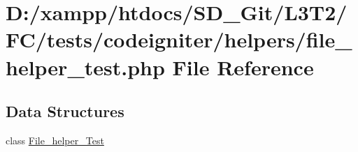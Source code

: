 \hypertarget{file__helper__test_8php}{}\section{D\+:/xampp/htdocs/\+S\+D\+\_\+\+Git/\+L3\+T2/\+F\+C/tests/codeigniter/helpers/file\+\_\+helper\+\_\+test.php File Reference}
\label{file__helper__test_8php}
\subsection*{Data Structures}
\begin{DoxyCompactItemize}
\item 
class \hyperlink{class_file__helper___test}{File\+\_\+helper\+\_\+\+Test}
\end{DoxyCompactItemize}
